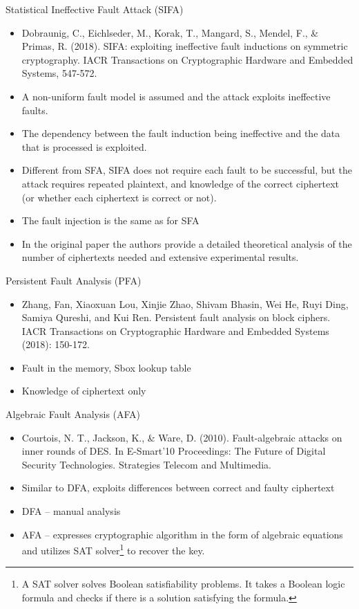 \begin{frame}{Statistical Ineffective Fault Attack (SIFA)}
    \begin{itemize}
        \item Dobraunig, C., Eichlseder, M., Korak, T., Mangard, S., Mendel, F., \& Primas, R. (2018). SIFA: exploiting ineffective fault inductions on symmetric cryptography. IACR Transactions on Cryptographic Hardware and Embedded Systems, 547-572.
        \item A non-uniform fault model is assumed and the attack exploits ineffective faults.
        \item The dependency between the fault induction being ineffective and the data that is
processed is exploited.
        \item Different from SFA, SIFA does not require each fault to be successful, but the attack requires repeated plaintext, and knowledge of the correct ciphertext (or whether each ciphertext is correct or not).
        \item The fault injection is the same as for SFA
        \item In the original paper the authors provide a detailed theoretical analysis of the number of ciphertexts needed and extensive experimental results.
    \end{itemize}
\end{frame}

\begin{frame}{Persistent Fault Analysis (PFA)}
    \begin{itemize}
        \item Zhang, Fan, Xiaoxuan Lou, Xinjie Zhao, Shivam Bhasin, Wei He, Ruyi Ding, Samiya Qureshi, and Kui Ren. Persistent fault analysis on block ciphers. IACR Transactions on Cryptographic Hardware and Embedded Systems (2018): 150-172.
        \item Fault in the memory, Sbox lookup table
        \item Knowledge of ciphertext only
    \end{itemize}
\end{frame}

\begin{frame}{Algebraic Fault Analysis (AFA)}
    \begin{itemize}
        \item Courtois, N. T., Jackson, K., \& Ware, D. (2010). Fault-algebraic attacks on inner rounds of DES. In E-Smart'10 Proceedings: The Future of Digital Security Technologies. Strategies Telecom and Multimedia.
        \item Similar to DFA, exploits differences between correct and faulty ciphertext
        \item DFA -- manual analysis
        \item AFA -- expresses cryptographic algorithm in the form of algebraic equations and utilizes SAT solver\footnote{A SAT solver solves Boolean satisfiability problems.
It takes a Boolean logic formula and checks if there is a solution satisfying the formula.} to recover the key.
    \end{itemize}
\end{frame}

